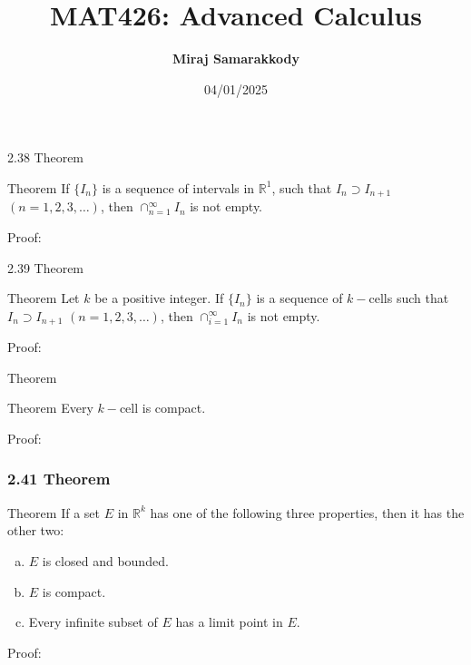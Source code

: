 \documentclass{beamer}
\title{MAT426: Advanced Calculus}
\author{\textbf{Miraj Samarakkody}}
\institute{Tougaloo College}
\date{04/01/2025}
\begin{document}
\begin{frame}
    \titlepage
\end{frame}



\begin{frame}{2.38 Theorem}
\begin{block}{Theorem}
If \(\{I_n\}\) is a sequence of intervals in \(\mathbb{R}^1\), such that \(I_n \supset I_{n+1}\) \((n=1,2,3,\dots)\), then \(\cap_{n=1}^\infty I_n\) is not empty. 
\end{block}
\begin{block}{Proof:}

\end{block}
\end{frame}

\begin{frame}{2.39 Theorem}
\begin{block}{Theorem}
Let \(k\) be a positive integer. If \(\{I_n\}\) is a sequence of \(k-\)cells such that \(I_n \supset I_{n+1}\) \((n=1,2,3,\dots)\), then \(\cap_{i=1}^\infty I_n\) is not empty. 
\end{block}
\begin{block}{Proof:}

\end{block}
\end{frame}

\begin{frame}{Theorem}
\begin{block}{Theorem}
Every \(k-\)cell is compact.
\end{block}
\begin{block}{Proof:}

\end{block}
\end{frame}

\begin{frame}
    \frametitle{2.41 Theorem}

    \begin{block}{Theorem}
        If a set \(E\) in \(\mathbb{R}^k\) has one of the following three properties, then it has the other two: 
        \begin{enumerate}[(a)]
            \item \(E\) is closed and bounded.
            \item \(E\) is compact. 
            \item Every infinite subset of \(E\) has a limit point in \(E\).
        \end{enumerate}
    \end{block}
    \begin{block}{Proof:}
        
    \end{block}

\end{frame}
\end{document}
